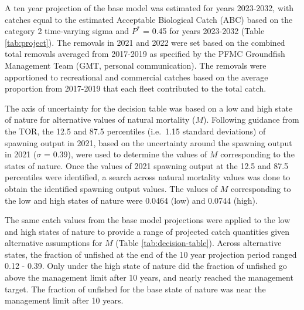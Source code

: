 \documentclass[11pt,
  english,
  a4paper,
]{article}
\begin{document}
\leavevmode\tagmcend\tagstructend


A ten year projection of the base model was estimated for years 2023-2032, with catches equal to the estimated Acceptable Biological Catch (ABC) based on the category 2 time-varying sigma and {\(P^*\)\leavevmode\tagmcend\tagstructend} = 0.45 for years 2023-2032 (Table \ref{tab:project}). The removals in 2021 and 2022 were set based on the combined total removals averaged from 2017-2019 as specified by the PFMC Groundfish Management Team (GMT, personal communication). The removals were apportioned to recreational and commercial catches based on the average proportion from 2017-2019 that each fleet contributed to the total catch.

\leavevmode\tagmcend\tagstructend\par


The axis of uncertainty for the decision table was based on a low and high state of nature for alternative values of natural mortality ({\(M\)\leavevmode\tagmcend\tagstructend}). Following guidance from the TOR, the 12.5 and 87.5 percentiles (i.e.~1.15 standard deviations) of spawning output in 2021, based on the uncertainty around the spawning output in 2021 ({\(\sigma\)\leavevmode\tagmcend\tagstructend} = 0.39), were used to determine the values of {\(M\)\leavevmode\tagmcend\tagstructend} corresponding to the states of nature. Once the values of 2021 spawning output at the 12.5 and 87.5 percentiles were identified, a search across natural mortality values was done to obtain the identified spawning output values. The values of {\(M\)\leavevmode\tagmcend\tagstructend} corresponding to the low and high states of nature were 0.0464 (low) and 0.0744 (high).

\leavevmode\tagmcend\tagstructend\par


The same catch values from the base model projections were applied to the low and high states of nature to provide a range of projected catch quantities given alternative assumptions for {\(M\)\leavevmode\tagmcend\tagstructend} (Table \ref{tab:decision-table}). Across alternative states, the fraction of unfished at the end of the 10 year projection period ranged 0.12 - 0.39. Only under the high state of nature did the fraction of unfished go above the management limit after 10 years, and nearly reached the management target. The fraction of unfished for the base state of nature was near the management limit after 10 years.
\end{document}

